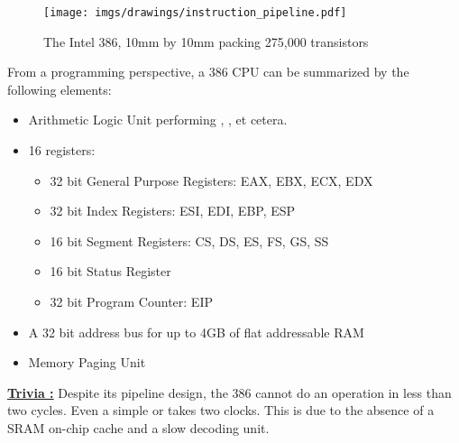 \documentclass[book.tex]{subfiles}
\begin{document}
\begin{figure}[H]
\centering
\texttt{[image: imgs/drawings/instruction\_pipeline.pdf]}\\
\end{figure}
\par
\begin{figure}[H]
\centering
{}
\caption{The Intel 386, 10mm by 10mm packing 275,000 transistors}
\end{figure}
\par
From a programming perspective, a 386 CPU can be summarized by the following elements:
\begin{itemize}
\item Arithmetic Logic Unit performing , ,  et cetera.
\item 16 registers:
\begin{itemize}
  \item 32 bit General Purpose Registers: EAX, EBX, ECX, EDX
  \item 32 bit Index Registers: ESI, EDI, EBP, ESP
  \item 16 bit Segment Registers: CS, DS, ES, FS, GS, SS
  \item 16 bit Status Register
  \item 32 bit Program Counter: EIP
\end{itemize}
\item A 32 bit address bus for up to 4GB of flat addressable RAM
\item Memory Paging Unit
\end{itemize}
 \par
 \textbf{\underline{Trivia :}} Despite its pipeline design, the 386 cannot do an operation in less than two cycles. Even a simple  or  takes two clocks. This is due to the absence of a SRAM on-chip cache and a slow decoding unit.\\
 \par
 
\end{document}
